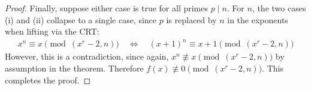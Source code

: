 \documentclass{article}
\theoremstyle{plain}
\theoremstyle{definition}
\begin{document}
\begin{proof}
Finally, suppose either case is true for all primes $p \mid n$. For $n$, the two cases (i) and (ii) collapse to a single case, since $p$ is replaced by $n$ in the exponents when lifting via the CRT:
\begin{align*}
x^n \equiv x \pmod{(x^r-2, n)} \quad\Longleftrightarrow\quad (x+1)^n \equiv x+1 \pmod{(x^r-2, n)}
\end{align*}
However, this is a contradiction, since again, $x^n \not\equiv x \pmod{(x^r-2, n)}$ by assumption in the theorem. Therefore $f(x) \not\equiv 0 \pmod{(x^r-2, n)}$. This completes the proof.
\end{proof}
\end{document}
